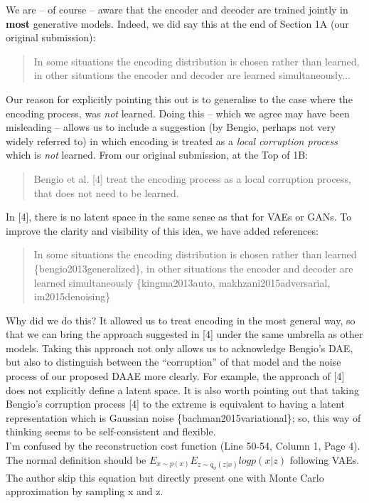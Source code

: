 \documentclass{article}
\begin{document}
 We are -- of course -- aware that the encoder and decoder are trained jointly in \textbf{most} generative models. Indeed, we did say this at the end of Section 1A (our original submission):
    \begin{quote}
        In some situations the encoding distribution is chosen rather than learned, in other  situations the encoder and decoder are learned simultaneously...
    \end{quote}
Our reason for explicitly pointing this out is to generalise to the case where the encoding process, was {\em not} learned. Doing this -- which we agree may have been misleading -- allows us to include a suggestion (by Bengio, perhaps not very widely referred to) in which encoding is treated as a {\em local corruption process} which is {\em not} learned.  From our original submission, at the Top of 1B:
    \begin{quote}
        Bengio  et  al.  [4]  treat  the  encoding  process  as  a  local corruption  process,  that  does  not  need  to  be  learned.
    \end{quote}
In [4], there is no latent space in the same sense as that for VAEs or GANs. To improve the clarity and visibility of this idea, we have added references:
\begin{quote}
    In some situations the encoding distribution is chosen rather than learned \{bengio2013generalized\}, in other situations the encoder and decoder are learned simultaneously \{kingma2013auto, makhzani2015adversarial, im2015denoising\}
\end{quote}
Why did we do this?  It allowed us to treat encoding in the most general way, so that we can bring the approach suggested in [4] under the same umbrella as other models. Taking this approach not only allows us to acknowledge Bengio's DAE, but also to distinguish between the ``corruption'' of that model and the noise process of our proposed DAAE more clearly. For example, the approach of [4] does not explicitly define a latent space.  It is also worth pointing out that taking Bengio's corruption process [4] to the extreme is equivalent to having a latent representation which is Gaussian noise \{bachman2015variational\}; so, this way of thinking seems to be self-consistent and flexible.\\


{\color{blue}
I’m confused by the reconstruction cost function (Line 50-54, Column 1, Page 4). The normal definition should be $E_{x\sim p(x)} E_{z\sim q_{\phi}(z|x)} log p(x | z)$ following VAEs. The author skip this equation but directly present one with Monte Carlo approximation by sampling x and z. }\\
\end{document}
